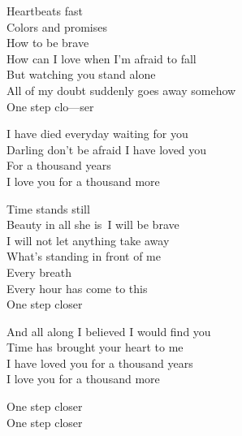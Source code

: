 
\re{}
Heartbeats fast\\
Colors and promises\\
How to be brave\\
How can I love when I'm afraid to fall\\
But watching you stand alone\\
All of my doubt suddenly goes away somehow\\
One step clo---ser

I have died everyday waiting for you\\
Darling don't be afraid I have loved you\\
For a thousand years\\
I love you for a thousand more

\re{}
Time stands still\\
Beauty in all she is\
I will be brave\\
I will not let anything take away\\
What's standing in front of me\\
Every breath\\
Every hour has come to this\\
One step closer


And all along I believed I would find you\\
Time has brought your heart to me\\
I have loved you for a thousand years\\
I love you for a thousand more

\re{}
One step closer\\
One step closer



\esong{}